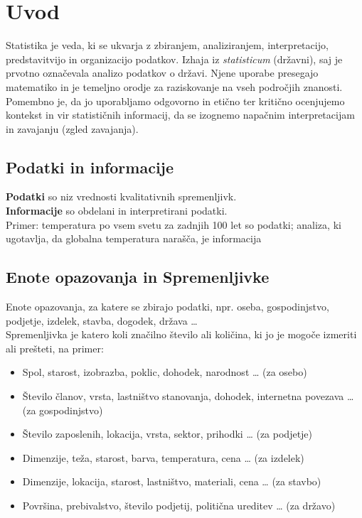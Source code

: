 \section{Uvod}

Statistika je veda, ki se ukvarja z zbiranjem, analiziranjem, interpretacijo, predstavitvijo in organizacijo podatkov. Izhaja iz \textit{statisticum} (državni), saj je prvotno označevala analizo podatkov o državi. Njene uporabe presegajo matematiko in je temeljno orodje za raziskovanje na vseh področjih znanosti. Pomembno je, da jo uporabljamo odgovorno in etično ter kritično ocenjujemo kontekst in vir statističnih informacij, da se izognemo napačnim interpretacijam in zavajanju (zgled zavajanja).


\subsection*{Podatki in informacije}

\textbf{Podatki} so niz vrednosti kvalitativnih spremenljivk.\\
\textbf{Informacije} so obdelani in interpretirani podatki.\\
Primer: temperatura po vsem svetu za zadnjih 100 let so podatki; analiza, ki ugotavlja, da globalna temperatura narašča, je informacija


\subsection*{Enote opazovanja in Spremenljivke}

Enote opazovanja, za katere se zbirajo podatki, npr. oseba, gospodinjstvo, podjetje, izdelek, stavba, dogodek, država …\\
Spremenljivka je katero koli značilno število ali količina, ki jo je mogoče izmeriti ali prešteti, na primer:
\begin{itemize}
\item Spol, starost, izobrazba, poklic, dohodek, narodnost … (za osebo)
\item Število članov, vrsta, lastništvo stanovanja, dohodek, internetna povezava … (za gospodinjstvo)
\item Število zaposlenih, lokacija, vrsta, sektor, prihodki … (za podjetje)
\item Dimenzije, teža, starost, barva, temperatura, cena … (za izdelek)
\item Dimenzije, lokacija, starost, lastništvo, materiali, cena … (za stavbo)
\item Površina, prebivalstvo, število podjetij, politična ureditev … (za državo)
\end{itemize}


